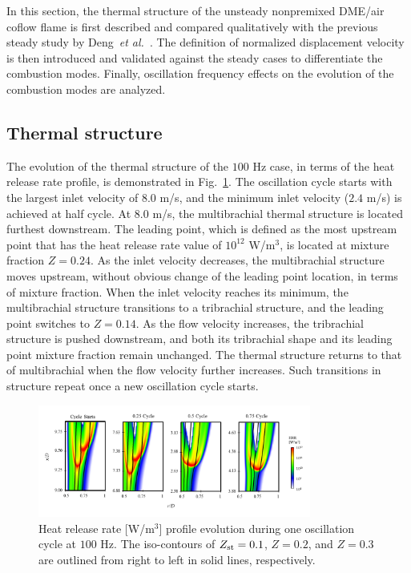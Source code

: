 \documentclass{essci}
\begin{document}
In this section, the thermal structure of the unsteady nonpremixed DME/air coflow flame is first described and compared qualitatively with the previous steady study by Deng~\emph{et al.}~\cite{deng15b}.  The definition of normalized displacement velocity is then introduced and validated against the steady cases to differentiate the combustion modes.  Finally, oscillation frequency effects on the evolution of the combustion modes are analyzed.

\subsection{Thermal structure}

The evolution of the thermal structure of the $100$ Hz case, in terms of the heat release rate profile, is demonstrated in Fig.~\ref{fig:HRR_100Hz}.  The oscillation cycle starts with the largest inlet velocity of $8.0$ m/s, and the minimum inlet velocity ($2.4$ m/s) is achieved at half cycle.  At $8.0$ m/s, the multibrachial thermal structure is located furthest downstream.  The leading point, which is defined as the most upstream point that has the heat release rate value of $10^{12}$ W/m$^3$, is located at mixture fraction $Z = 0.24$.  As the inlet velocity decreases, the multibrachial structure moves upstream, without obvious change of the leading point location, in terms of mixture fraction.  When the inlet velocity reaches its minimum, the multibrachial structure transitions to a tribrachial structure, and the leading point switches to $Z = 0.14$.  As the flow velocity increases, the tribrachial structure is pushed downstream, and both its tribrachial shape and its leading point mixture fraction remain unchanged.  The thermal structure returns to that of multibrachial when the flow velocity further increases.  Such transitions in structure repeat once a new oscillation cycle starts.

\begin{figure}[t]
  \centering
  \scriptsize
  \vspace{-0.10in}
  \includegraphics[trim=6.5mm 7.5mm 7mm 8mm, clip=true, width=0.8\textwidth]{HRR_100Hz.png}
  \normalsize
  \vspace{-0.2in}
  \caption{Heat release rate [W/m$^3$] profile evolution during one oscillation cycle at $100$ Hz.  The iso-contours of $Z_{\rm st} = 0.1$, $Z = 0.2$, and $Z = 0.3$ are outlined from right to left in solid lines, respectively.}
  \label{fig:HRR_100Hz}
\end{figure}
\end{document}
